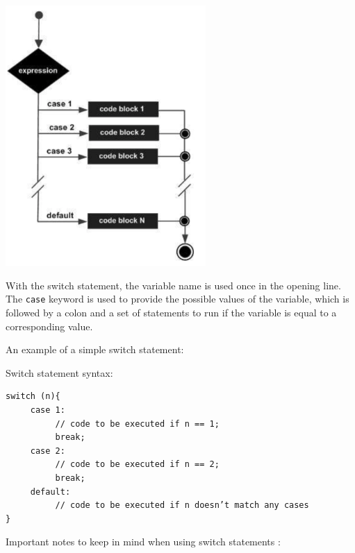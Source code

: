 \begin{center}
    \includegraphics[width = 3in]{images/switchdiagram.png}
\end{center}

With the switch statement, the variable name is used once in the opening line. The \texttt{case} keyword is used to provide the possible values of the variable, which is followed by a colon and a set of statements to run if the variable is equal to a corresponding value.

An example of a simple switch statement:

\begin{example}
    Switch statement syntax:
\begin{verbatim}
switch (n){
     case 1:
          // code to be executed if n == 1;
          break;
     case 2:
          // code to be executed if n == 2;
          break;
     default:
          // code to be executed if n doesn’t match any cases
}
\end{verbatim}
\end{example}

Important notes to keep in mind when using switch statements :


